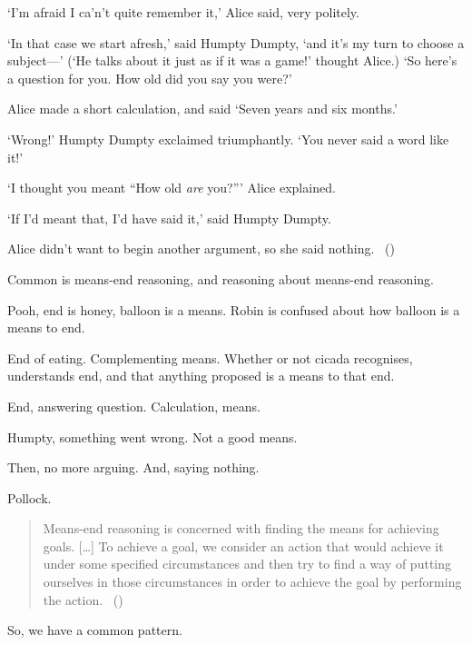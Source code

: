 \begin{note}
  \begin{scenario}
    `I'm afraid I ca'n't quite remember it,'
    Alice said, very politely.

    \noindent%
    `In that case we start afresh,'
    said Humpty Dumpty,
    `and it's my turn to choose a subject---'
    (`He talks about it just as if it was a game!' thought Alice.)
    `So here's a question for you. How old did you say you were?'

    \noindent%
    Alice made a short calculation, and said
    `Seven years and six months.'

    \noindent%
    `Wrong!'
    Humpty Dumpty exclaimed triumphantly.
    `You never said a word like it!'

    \noindent%
    `I thought you meant ``How old \emph{are} you?'''
    Alice explained.

    \noindent%
    `If I'd meant that, I'd have said it,'
    said Humpty Dumpty.

    \noindent%
    Alice didn't want to begin another argument, so she said nothing.\newline
    \mbox{ }\hfill\mbox{(\cite[188]{Carroll:2009aa})}\newline
    \mbox{ }
  \end{scenario}
\end{note}

\begin{note}
  Common is means-end reasoning, and reasoning about means-end reasoning.

  Pooh, end is honey, balloon is a means.
  Robin is confused about how balloon is a means to end.

  End of eating.
  Complementing means.
  Whether or not cicada recognises, understands end, and that anything proposed is a means to that end.

  End, answering question.
  Calculation, means.

  Humpty, something went wrong.
  Not a good means.

  Then, no more arguing.
  And, saying nothing.
\end{note}

\begin{note}
  Pollock.

  \begin{quote}
    Means-end reasoning is concerned with finding the means for achieving goals.
    [\dots]
    To achieve a goal, we consider an action that would achieve it under some specified circumstances and then try to find a way of putting ourselves in those circumstances in order to achieve the goal by performing the action.%
    \mbox{ }\hfill\mbox{(\cite[60]{Pollock:2002aa})}
  \end{quote}

  So, we have a common pattern.
\end{note}

